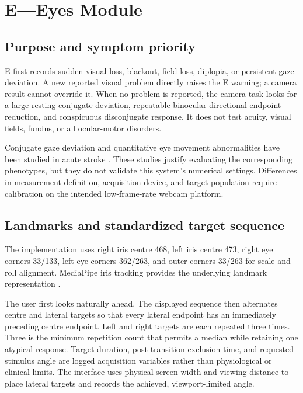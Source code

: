 \documentclass[11pt,a4paper]{article}
\begin{document}
\section{E---Eyes Module}

\subsection{Purpose and symptom priority}

E first records sudden visual loss, blackout, field loss, diplopia, or persistent gaze deviation. A new reported visual problem directly raises the E warning; a camera result cannot override it. When no problem is reported, the camera task looks for a large resting conjugate deviation, repeatable binocular directional endpoint reduction, and conspicuous disconjugate response. It does not test acuity, visual fields, fundus, or all ocular-motor disorders.

Conjugate gaze deviation and quantitative eye movement abnormalities have been studied in acute stroke \cite{singer2006gaze,kudo2021eyemovement}. These studies justify evaluating the corresponding phenotypes, but they do not validate this system's numerical settings. Differences in measurement definition, acquisition device, and target population require calibration on the intended low-frame-rate webcam platform.

\subsection{Landmarks and standardized target sequence}

The implementation uses right iris centre 468, left iris centre 473, right eye corners 33/133, left eye corners 362/263, and outer corners 33/263 for scale and roll alignment. MediaPipe iris tracking provides the underlying landmark representation \cite{bazarevsky2020mediapipeiris}.

The user first looks naturally ahead. The displayed sequence then alternates centre and lateral targets so that every lateral endpoint has an immediately preceding centre endpoint. Left and right targets are each repeated three times. Three is the minimum repetition count that permits a median while retaining one atypical response. Target duration, post-transition exclusion time, and requested stimulus angle are logged acquisition variables rather than physiological or clinical limits. The interface uses physical screen width and viewing distance to place lateral targets and records the achieved, viewport-limited angle.
\end{document}
